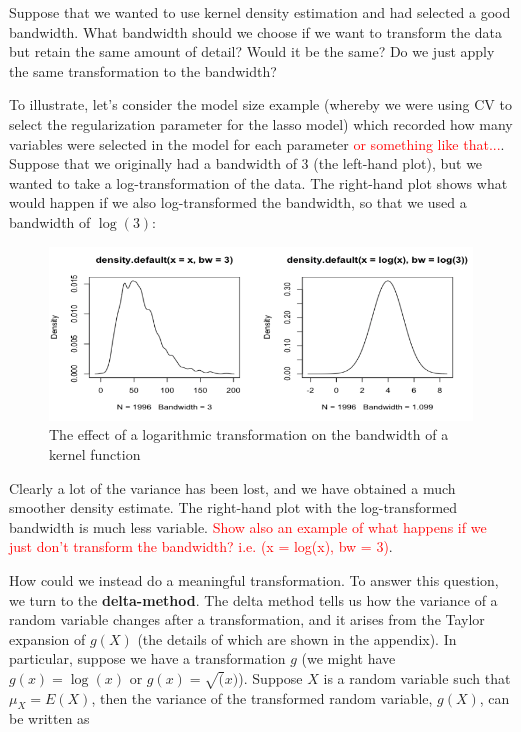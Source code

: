 Suppose that we wanted to use kernel density estimation and had selected a good bandwidth. What bandwidth should we choose if we want to transform the data but retain the same amount of detail? Would it be the same? Do we just apply the same transformation to the bandwidth?

To illustrate, let's consider the model size example (whereby we were using CV to select the regularization parameter for the lasso model) which recorded how many variables were selected in the model for each parameter \textcolor{red}{or something like that...}. Suppose that we originally had a bandwidth of 3 (the left-hand plot), but we wanted to take a log-transformation of the data. The right-hand plot shows what would happen if we also log-transformed the bandwidth, so that we used a bandwidth of $\log(3)$:


\begin{figure}[H]
\begin{center}
\includegraphics[scale=0.5]{log-transform-kernel.png}
\end{center}
\caption{The effect of a logarithmic transformation on the bandwidth of a kernel function}
\label{fig:log_kernel}
\end{figure}


Clearly a lot of the variance has been lost, and we have obtained a much smoother density estimate. The right-hand plot with the log-transformed bandwidth is much less variable. \textcolor{red}{Show also an example of what happens if we just don't transform the bandwidth? i.e. (x = log(x), bw = 3)}. 

How could we instead do a meaningful transformation. To answer this question, we turn to the \textbf{delta-method}. The delta method tells us how the variance of a random variable changes after a transformation, and it arises from the Taylor expansion of $g(X)$ (the details of which are shown in the appendix). In particular, suppose we have a transformation $g$ (we might have $g(x) = \log(x)$ or $g(x) = \sqrt(x)$). Suppose $X$ is a random variable such that $\mu_X = E(X)$, then the variance of the transformed random variable, $g(X)$, can be written as

